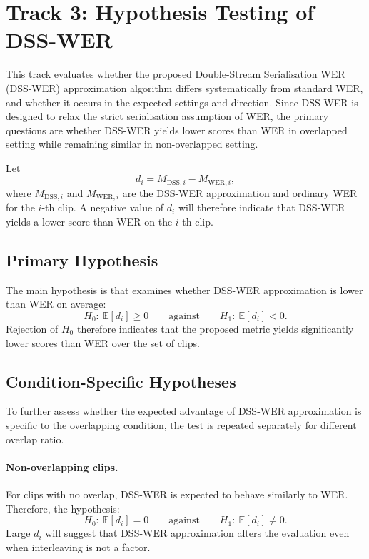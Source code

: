 \section{Track 3: Hypothesis Testing of DSS-WER}
\label{sec:t3_dss_wer_hypothesis_testing}
This track evaluates whether the proposed Double-Stream Serialisation WER (DSS-WER) approximation algorithm differs systematically from standard WER, and whether it occurs in the expected settings and direction. Since DSS-WER is designed to relax the strict serialisation assumption of WER, the primary questions are whether DSS-WER yields lower scores than WER in overlapped setting while remaining similar in non-overlapped setting.

Let 
\begin{equation}
    d_i = M_{\text{DSS},i} - M_{\text{WER},i},
\end{equation}
where $M_{\text{DSS},i}$ and $M_{\text{WER},i}$ are the DSS-WER approximation and ordinary WER for the $i$-th clip. A negative value of $d_i$ will therefore indicate that DSS-WER yields a lower score than WER on the $i$-th clip. 
\subsection{Primary Hypothesis}
The main hypothesis is that examines whether DSS-WER approximation is lower than WER on average:
\begin{equation}
H_0:\ \mathbb{E}[d_i] \ge 0
\qquad \text{against} \qquad
H_1:\ \mathbb{E}[d_i] < 0.
\end{equation}
Rejection of $H_0$ therefore indicates that the proposed metric yields significantly lower scores than WER over the set of clips.
\subsection{Condition-Specific Hypotheses}
To further assess whether the expected advantage of DSS-WER approximation is specific to the overlapping condition, the test is repeated separately for different overlap ratio.

\paragraph{Non-overlapping clips.} For clips with no overlap, DSS-WER is expected to behave similarly to WER. Therefore, the hypothesis:
\begin{equation}
    H_0:\ \mathbb{E}[d_i] = 0
    \qquad \text{against} \qquad
    H_1:\ \mathbb{E}[d_i] \neq 0.
\end{equation}
Large $d_i$ will suggest that DSS-WER approximation alters the evaluation even when interleaving is not a factor.

